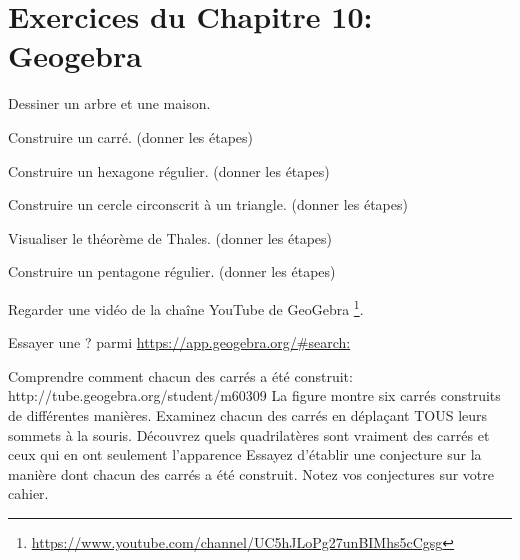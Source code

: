 
\section*{Exercices du Chapitre 10: Geogebra}


\begin{exercice}
Dessiner un arbre et une maison.
\end{exercice}

\begin{exercice}
Construire un carré. (donner les étapes)
\end{exercice}

\begin{exercice}
Construire un hexagone régulier. (donner les étapes)
\end{exercice}

\begin{exercice}
Construire un cercle circonscrit à un triangle. (donner les étapes)
\end{exercice}

\begin{exercice}
Visualiser le théorème de Thales. (donner les étapes)
\end{exercice}

\begin{exercice}
Construire un pentagone régulier. (donner les étapes)
\end{exercice}

\begin{exercice}
Regarder une vidéo de la chaîne YouTube de GeoGebra
\footnote{\url{https://www.youtube.com/channel/UC5hJLoPg27unBIMhs5cCgsg}}.
\end{exercice}

\begin{exercice}
Essayer une ? parmi \url{https://app.geogebra.org/#search:}
\end{exercice}

\begin{exercice}
Comprendre comment chacun des carrés a été construit:
http://tube.geogebra.org/student/m60309
La figure montre six carrés construits de différentes manières. 
Examinez chacun des carrés en déplaçant TOUS leurs
sommets à la souris.
Découvrez quels quadrilatères sont vraiment des carrés
et ceux qui en ont seulement l’apparence
Essayez d'établir une conjecture sur la manière dont
chacun des carrés a été construit.
Notez vos conjectures sur votre cahier.
\end{exercice}

